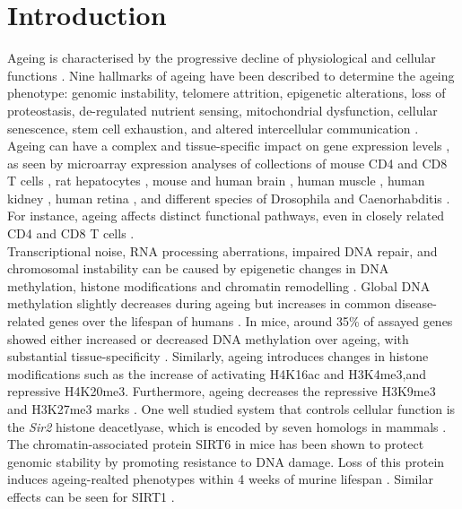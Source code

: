 
\section{Introduction}

Ageing is characterised by the progressive decline of physiological and cellular functions \citep{Lopez-Otin2013, Booth2016}. Nine hallmarks of ageing have been described to determine the ageing phenotype: genomic instability, telomere attrition, epigenetic alterations, loss of proteostasis, de-regulated nutrient sensing, mitochondrial dysfunction, cellular senescence, stem cell exhaustion, and altered intercellular communication \citep{Lopez-Otin2013}. Ageing can have a complex and tissue-specific impact on gene expression levels \citep{Zahn2007}, as seen by microarray expression analyses of collections of mouse CD4\plus{} and CD8\plus{} T cells \citep{Mirza2011}, rat hepatocytes \citep{Tollet-Egnell2000}, mouse and human brain \citep{Lu2004, Lee2000}, human muscle \citep{Welle2003, Zahn2006}, human kidney \citep{Rodwell2004}, human retina \citep{Yoshida2002}, and different species of Drosophila and Caenorhabditis \citep{Mccarroll2004}. For instance, ageing affects distinct functional pathways, even in closely related CD4\plus{} and CD8\plus{} T cells \citep{Mirza2011}. \\

Transcriptional noise, RNA processing aberrations, impaired DNA repair, and chromosomal instability can be caused by epigenetic changes in DNA methylation, histone modifications and chromatin remodelling \citep{Lopez-Otin2013}. Global DNA methylation slightly decreases during ageing but increases in common disease-related genes over the lifespan of humans \citep{Talens2012}. In mice, around 35\% of assayed genes showed either increased or decreased DNA methylation over ageing, with substantial tissue-specificity \citep{Maegawa2010}. Similarly, ageing introduces changes in histone modifications such as the increase of activating \gls{H4K16ac} and \gls{H3K4me3},and repressive \gls{H4K20me3}. Furthermore, ageing decreases the repressive \gls{H3K9me3} and \gls{H3K27me3} marks \citep{Han2012, Fraga2007}. One well studied system that controls cellular function is the \emph{\gls{Sir}2} histone deacetlyase, which is encoded by seven homologs in mammals \citep{Houtkooper2016}. The chromatin-associated protein SIRT6 in mice has been shown to protect genomic stability by promoting resistance to DNA damage. Loss of this protein induces ageing-realted phenotypes within 4 weeks of murine lifespan \cite{Mostoslavsky2006}. Similar effects can be seen for SIRT1 \cite{Oberdoerffer2008}.\\

